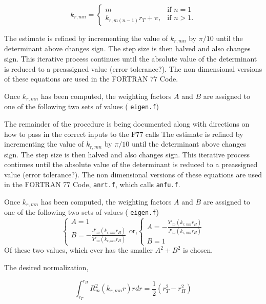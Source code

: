 \documentclass[12pt]{article}
\begin{document}
 \begin{equation}
     k_{r,mn} = 
    \begin{cases}
        m & \text{if } n = 1\\
        k_{r,m(n-1)} r_T + \pi,              & \text{if }  n > 1.
    \end{cases}
 \end{equation}

 The estimate is refined by incrementing the value of $k_{r,mn}$ by $\pi/10$ until
 the determinant above changes sign. The step size is then halved and also changes 
 sign. This iterative process continues until the absolute value of the determinant 
 is reduced to a preassigned value (error tolerance?). The non dimensional versions
 of these equations are used in the FORTRAN 77 Code.

 Once $k_{r,mn}$ has been computed, the weighting factors $A$ and $B$ are assigned to 
 one of the following two sets of values ( \verb|eigen.f|)


 The remainder of the procedure is being documented along with directions on 
 how to pass in the correct inputs to the F77 calls
 The estimate is refined by incrementing the value of $k_{r,mn}$ by $\pi/10$ until
 the determinant above changes sign. The step size is then halved and also changes 
 sign. This iterative process continues until the absolute value of the determinant 
 is reduced to a preassigned value (error tolerance?). The non dimensional versions
 of these equations are used in the FORTRAN 77 Code, \verb|anrt.f|, which calls 
 \verb|anfu.f|.

 Once $k_{r,mn}$ has been computed, the weighting factors $A$ and $B$ are assigned to 
 one of the following two sets of values ( \verb|eigen.f|)
 \begin{equation*}
     \begin{cases}
         A = 1 \\ 
         B = - \frac{J'_m(k_{r,mn} r_H )}{Y'_m(k_{r,mn} r_H )}
     \end{cases}
     \text{or,}
     \begin{cases}
         A =- \frac{Y'_m(k_{r,mn} r_H )}{J'_m(k_{r,mn} r_H )}  \\
         B = 1
     \end{cases}
 \end{equation*}
Of these two values, which ever has the smaller $A^2 + B^2$ is chosen.

The desired normalization,

\begin{equation}
    \int_{r_T}^{r_H} R_m^2(k_{r,mn} r) r dr = \frac{1}{2}\left( r_T^2-r_H^2 \right)
    \label{eqn:desirednormalization}
\end{equation}
\end{document}
